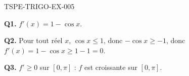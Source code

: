 \begin{corrige}{TSPE-TRIGO-EX-005}

\textbf{Q1.} $f'(x) = 1 - \cos x$.

\textbf{Q2.} Pour tout réel $x$, $\cos x \leq 1$, donc $-\cos x \geq -1$, donc $f'(x) = 1 - \cos x \geq 1 - 1 = 0$.

\textbf{Q3.} $f' \geq 0$ sur $[0,\pi]$ : $f$ est croissante sur $[0,\pi]$.

\end{corrige}
